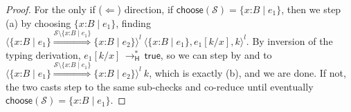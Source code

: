 \documentclass[9pt]{extarticle}
\newcommand{\ottnt}[1]{\mathit{#1}}
\newcommand{\ottsym}[1]{#1}
\begin{document}
{\begin{lemma}
\begin{proof}
{    For the only if ($\Leftarrow$) direction, if $ \mathsf{choose} ( \mathcal{S} )   \ottsym{=}   \{ \mathit{x} \mathord{:} \ottnt{B} \mathrel{\mid} \ottnt{e_{{\mathrm{1}}}} \} $, then we step (a) by  choosing
    $ \{ \mathit{x} \mathord{:} \ottnt{B} \mathrel{\mid} \ottnt{e_{{\mathrm{1}}}} \} $, finding $ \langle   \{ \mathit{x} \mathord{:} \ottnt{B} \mathrel{\mid} \ottnt{e_{{\mathrm{1}}}} \}   \mathord{ \overset{  \mathcal{S}  \setminus   \{ \mathit{x} \mathord{:} \ottnt{B} \mathrel{\mid} \ottnt{e_{{\mathrm{1}}}} \}   }{\Rightarrow} }   \{ \mathit{x} \mathord{:} \ottnt{B} \mathrel{\mid} \ottnt{e_{{\mathrm{2}}}} \}   \rangle^{ \ottnt{l} } ~   \langle   \{ \mathit{x} \mathord{:} \ottnt{B} \mathrel{\mid} \ottnt{e_{{\mathrm{1}}}} \}  ,   \ottnt{e_{{\mathrm{1}}}}  [  \ottnt{k} / \mathit{x}  ]  ,  \ottnt{k}  \rangle^{ \ottnt{l} }  $. By inversion of the typing derivation,
    $ \ottnt{e_{{\mathrm{1}}}}  [  \ottnt{k} / \mathit{x}  ]  \,  \longrightarrow ^{*}_{  \mathsf{H}  }  \,  \mathsf{true} $, so we can step by  and
     to $ \langle   \{ \mathit{x} \mathord{:} \ottnt{B} \mathrel{\mid} \ottnt{e_{{\mathrm{1}}}} \}   \mathord{ \overset{  \mathcal{S}  \setminus   \{ \mathit{x} \mathord{:} \ottnt{B} \mathrel{\mid} \ottnt{e_{{\mathrm{1}}}} \}   }{\Rightarrow} }   \{ \mathit{x} \mathord{:} \ottnt{B} \mathrel{\mid} \ottnt{e_{{\mathrm{2}}}} \}   \rangle^{ \ottnt{l} } ~  \ottnt{k} $, which
    is exactly (b), and we are done.
If not, the two casts step to the same sub-checks and co-reduce
    until eventually $ \mathsf{choose} ( \mathcal{S} )   \ottsym{=}   \{ \mathit{x} \mathord{:} \ottnt{B} \mathrel{\mid} \ottnt{e_{{\mathrm{1}}}} \} $.

}
\end{proof}
\end{lemma}}
\end{document}
